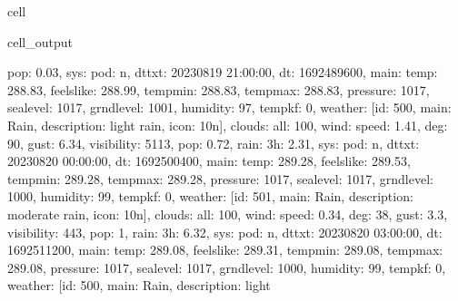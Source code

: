 \documentclass[letterpaper,10pt,english]{jupyterBook}
\begin{document}
\begin{sphinxuseclass}{cell}
\begin{sphinxVerbatimOutput}
\begin{sphinxuseclass}{cell_output}
\begin{sphinxVerbatim}[commandchars=\\\{\}]
\PYGZsq{}pop\PYGZsq{}: 0.03, \PYGZsq{}sys\PYGZsq{}: \PYGZob{}\PYGZsq{}pod\PYGZsq{}: \PYGZsq{}n\PYGZsq{}\PYGZcb{}, \PYGZsq{}dt\PYGZus{}txt\PYGZsq{}: \PYGZsq{}2023\PYGZhy{}08\PYGZhy{}19 21:00:00\PYGZsq{}\PYGZcb{}, \PYGZob{}\PYGZsq{}dt\PYGZsq{}: 1692489600, \PYGZsq{}main\PYGZsq{}: \PYGZob{}\PYGZsq{}temp\PYGZsq{}: 288.83, \PYGZsq{}feels\PYGZus{}like\PYGZsq{}: 288.99, \PYGZsq{}temp\PYGZus{}min\PYGZsq{}: 288.83, \PYGZsq{}temp\PYGZus{}max\PYGZsq{}: 288.83, \PYGZsq{}pressure\PYGZsq{}: 1017, \PYGZsq{}sea\PYGZus{}level\PYGZsq{}: 1017, \PYGZsq{}grnd\PYGZus{}level\PYGZsq{}: 1001, \PYGZsq{}humidity\PYGZsq{}: 97, \PYGZsq{}temp\PYGZus{}kf\PYGZsq{}: 0\PYGZcb{}, \PYGZsq{}weather\PYGZsq{}: [\PYGZob{}\PYGZsq{}id\PYGZsq{}: 500, \PYGZsq{}main\PYGZsq{}: \PYGZsq{}Rain\PYGZsq{}, \PYGZsq{}description\PYGZsq{}: \PYGZsq{}light rain\PYGZsq{}, \PYGZsq{}icon\PYGZsq{}: \PYGZsq{}10n\PYGZsq{}\PYGZcb{}], \PYGZsq{}clouds\PYGZsq{}: \PYGZob{}\PYGZsq{}all\PYGZsq{}: 100\PYGZcb{}, \PYGZsq{}wind\PYGZsq{}: \PYGZob{}\PYGZsq{}speed\PYGZsq{}: 1.41, \PYGZsq{}deg\PYGZsq{}: 90, \PYGZsq{}gust\PYGZsq{}: 6.34\PYGZcb{}, \PYGZsq{}visibility\PYGZsq{}: 5113, \PYGZsq{}pop\PYGZsq{}: 0.72, \PYGZsq{}rain\PYGZsq{}: \PYGZob{}\PYGZsq{}3h\PYGZsq{}: 2.31\PYGZcb{}, \PYGZsq{}sys\PYGZsq{}: \PYGZob{}\PYGZsq{}pod\PYGZsq{}: \PYGZsq{}n\PYGZsq{}\PYGZcb{}, \PYGZsq{}dt\PYGZus{}txt\PYGZsq{}: \PYGZsq{}2023\PYGZhy{}08\PYGZhy{}20 00:00:00\PYGZsq{}\PYGZcb{}, \PYGZob{}\PYGZsq{}dt\PYGZsq{}: 1692500400, \PYGZsq{}main\PYGZsq{}: \PYGZob{}\PYGZsq{}temp\PYGZsq{}: 289.28, \PYGZsq{}feels\PYGZus{}like\PYGZsq{}: 289.53, \PYGZsq{}temp\PYGZus{}min\PYGZsq{}: 289.28, \PYGZsq{}temp\PYGZus{}max\PYGZsq{}: 289.28, \PYGZsq{}pressure\PYGZsq{}: 1017, \PYGZsq{}sea\PYGZus{}level\PYGZsq{}: 1017, \PYGZsq{}grnd\PYGZus{}level\PYGZsq{}: 1000, \PYGZsq{}humidity\PYGZsq{}: 99, \PYGZsq{}temp\PYGZus{}kf\PYGZsq{}: 0\PYGZcb{}, \PYGZsq{}weather\PYGZsq{}: [\PYGZob{}\PYGZsq{}id\PYGZsq{}: 501, \PYGZsq{}main\PYGZsq{}: \PYGZsq{}Rain\PYGZsq{}, \PYGZsq{}description\PYGZsq{}: \PYGZsq{}moderate rain\PYGZsq{}, \PYGZsq{}icon\PYGZsq{}: \PYGZsq{}10n\PYGZsq{}\PYGZcb{}], \PYGZsq{}clouds\PYGZsq{}: \PYGZob{}\PYGZsq{}all\PYGZsq{}: 100\PYGZcb{}, \PYGZsq{}wind\PYGZsq{}: \PYGZob{}\PYGZsq{}speed\PYGZsq{}: 0.34, \PYGZsq{}deg\PYGZsq{}: 38, \PYGZsq{}gust\PYGZsq{}: 3.3\PYGZcb{}, \PYGZsq{}visibility\PYGZsq{}: 443, \PYGZsq{}pop\PYGZsq{}: 1, \PYGZsq{}rain\PYGZsq{}: \PYGZob{}\PYGZsq{}3h\PYGZsq{}: 6.32\PYGZcb{}, \PYGZsq{}sys\PYGZsq{}: \PYGZob{}\PYGZsq{}pod\PYGZsq{}: \PYGZsq{}n\PYGZsq{}\PYGZcb{}, \PYGZsq{}dt\PYGZus{}txt\PYGZsq{}: \PYGZsq{}2023\PYGZhy{}08\PYGZhy{}20 03:00:00\PYGZsq{}\PYGZcb{}, \PYGZob{}\PYGZsq{}dt\PYGZsq{}: 1692511200, \PYGZsq{}main\PYGZsq{}: \PYGZob{}\PYGZsq{}temp\PYGZsq{}: 289.08, \PYGZsq{}feels\PYGZus{}like\PYGZsq{}: 289.31, \PYGZsq{}temp\PYGZus{}min\PYGZsq{}: 289.08, \PYGZsq{}temp\PYGZus{}max\PYGZsq{}: 289.08, \PYGZsq{}pressure\PYGZsq{}: 1017, \PYGZsq{}sea\PYGZus{}level\PYGZsq{}: 1017, \PYGZsq{}grnd\PYGZus{}level\PYGZsq{}: 1000, \PYGZsq{}humidity\PYGZsq{}: 99, \PYGZsq{}temp\PYGZus{}kf\PYGZsq{}: 0\PYGZcb{}, \PYGZsq{}weather\PYGZsq{}: [\PYGZob{}\PYGZsq{}id\PYGZsq{}: 500, \PYGZsq{}main\PYGZsq{}: \PYGZsq{}Rain\PYGZsq{}, \PYGZsq{}description\PYGZsq{}: \PYGZsq{}light 
\end{sphinxVerbatim}
\end{sphinxuseclass}
\end{sphinxVerbatimOutput}
\end{sphinxuseclass}
\end{document}
